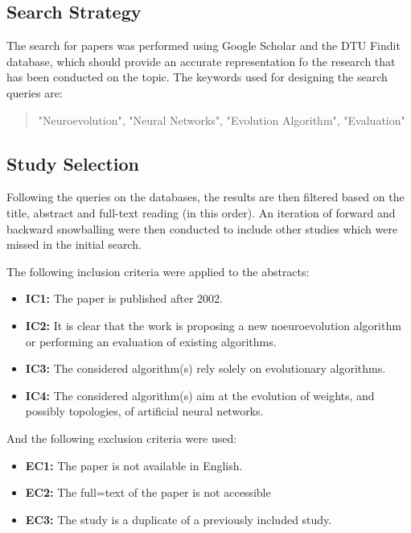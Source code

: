\subsection{Search Strategy}

The search for papers was performed using Google Scholar and the DTU Findit database, which should provide an accurate representation fo the research that has been
conducted on the topic. The keywords used for designing the search queries are:

\begin{quote}
    "Neuroevolution", "Neural Networks", "Evolution Algorithm", "Evaluation"
\end{quote}

\subsection{Study Selection}

Following the queries on the databases, the results are then filtered based on the title, abstract and full-text reading (in this order). An iteration of forward
and backward snowballing were then conducted to include other studies which were missed in the initial search.

The following inclusion criteria were applied to the abstracts:

\begin{itemize}
    \item \textbf{IC1:} The paper is published after 2002.
    \item \textbf{IC2:} It is clear that the work is proposing a new noeuroevolution algorithm or performing an evaluation of existing algorithms.
    \item \textbf{IC3:} The considered algorithm(s) rely solely on evolutionary algorithms.
    \item \textbf{IC4:} The considered algorithm(s) aim at the evolution of weights, and possibly topologies, of artificial neural networks.
\end{itemize}

And the following exclusion criteria were used:

\begin{itemize}
    \item \textbf{EC1:} The paper is not available in English.
    \item \textbf{EC2:} The full=text of the paper is not accessible
    \item \textbf{EC3:} The study is a duplicate of a previously included study.
\end{itemize}

